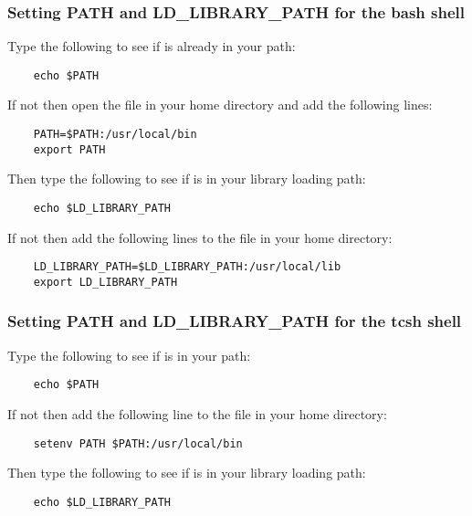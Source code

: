 \subsubsection{Setting PATH and LD\_LIBRARY\_PATH for the bash shell}
\label{section:bash_shell}
Type the following to see if  is already in your path:

\begin{verbatim}
    echo $PATH
\end{verbatim}

If not then open the  file in your home directory and
add the following lines:

\begin{verbatim}
    PATH=$PATH:/usr/local/bin
    export PATH
\end{verbatim}

Then type the following to see if  is in your
library loading path:

\begin{verbatim}
    echo $LD_LIBRARY_PATH
\end{verbatim}

If not then add the following lines to the  file in
your home directory:

\begin{verbatim}
    LD_LIBRARY_PATH=$LD_LIBRARY_PATH:/usr/local/lib
    export LD_LIBRARY_PATH
\end{verbatim}

\subsubsection{Setting PATH and LD\_LIBRARY\_PATH for the tcsh shell}
\label{section:tcsh_shell}
Type the following to see if  is in your path:

\begin{verbatim}
    echo $PATH
\end{verbatim}

If not then add the following line to the  file in
your home directory:

\begin{verbatim}
    setenv PATH $PATH:/usr/local/bin
\end{verbatim}

Then type the following to see if  is in your
library loading path:

\begin{verbatim}
    echo $LD_LIBRARY_PATH
\end{verbatim}

